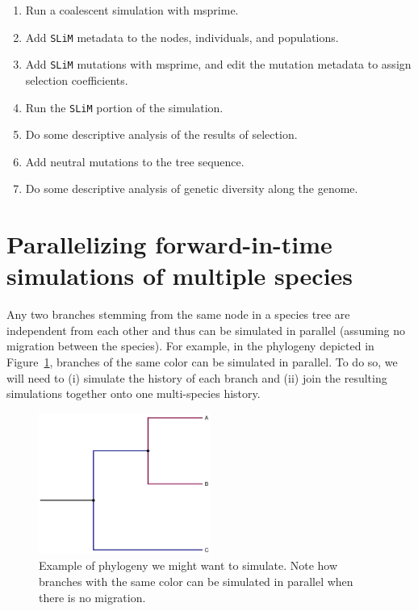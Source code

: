 \documentclass[12pt]{article}
\newcommand{\slim}[0]{\texttt{SLiM}\xspace}
\begin{document}
\begin{enumerate}
    \item Run a coalescent simulation with msprime.

    \item Add \slim metadata to the nodes, individuals, and populations.

    \item Add \slim mutations with msprime, and edit the mutation metadata to assign selection coefficients.

    \item Run the \slim portion of the simulation.

    \item Do some descriptive analysis of the results of selection.

    \item Add neutral mutations to the tree sequence.

    \item Do some descriptive analysis of genetic diversity along the genome.
\end{enumerate}

\section*{Parallelizing forward-in-time simulations of multiple species}

Any two branches stemming from the same node in a species tree are independent from each other and
thus can be simulated in parallel (assuming no migration between the species).
For example, in the phylogeny depicted in Figure~\ref{fig:phylo},
branches of the same color can be simulated in parallel.
To do so, we will need to
(i) simulate the history of each branch and
(ii) join the resulting simulations together onto one multi-species history.

 \begin{figure}[h!]
 \centering
  \includegraphics[width=0.5\textwidth]{./code/parallelizing_phylogeny/phylo.pdf}
  \caption{Example of phylogeny we might want to simulate. Note how branches with the same color can be simulated in parallel when there is no migration.}
  \label{fig:phylo}
 \end{figure}
\end{document}
